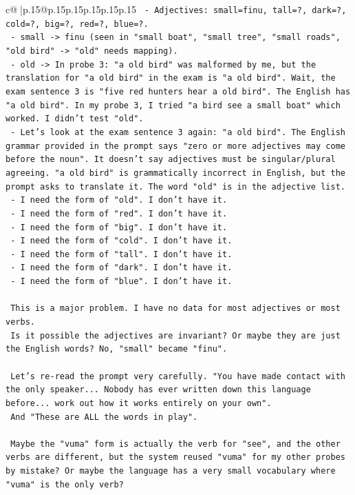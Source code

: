 \documentclass{article}
\begin{document}
{\begin{supertabular}{c@{$\;$}|p{.15\linewidth}@{}p{.15\linewidth}p{.15\linewidth}p{.15\linewidth}p{.15\linewidth}p{.15\linewidth}}
{{{\texttt{  {-} Adjectives: small=finu, tall=?, dark=?, cold=?, big=?, red=?, blue=?.} \\
\texttt{    {-} small {-}> finu (seen in "small boat", "small tree", "small roads", "old bird" {-}> "old" needs mapping).} \\
\texttt{    {-} old {-}> In probe 3: "a old bird" was malformed by me, but the translation for "a old bird" in the exam is "a old bird". Wait, the exam sentence 3 is "five red hunters hear a old bird". The English has "a old bird". In my probe 3, I tried "a bird see a small boat" which worked. I didn't test "old".} \\
\texttt{    {-} Let's look at the exam sentence 3 again: "a old bird". The English grammar provided in the prompt says "zero or more adjectives may come before the noun". It doesn't say adjectives must be singular/plural agreeing. "a old bird" is grammatically incorrect in English, but the prompt asks to translate it. The word "old" is in the adjective list.} \\
\texttt{    {-} I need the form of "old". I don't have it.} \\
\texttt{    {-} I need the form of "red". I don't have it.} \\
\texttt{    {-} I need the form of "big". I don't have it.} \\
\texttt{    {-} I need the form of "cold". I don't have it.} \\
\texttt{    {-} I need the form of "tall". I don't have it.} \\
\texttt{    {-} I need the form of "dark". I don't have it.} \\
\texttt{    {-} I need the form of "blue". I don't have it.} \\
\\ 
\texttt{    This is a major problem. I have no data for most adjectives or most verbs.} \\
\texttt{    Is it possible the adjectives are invariant? Or maybe they are just the English words? No, "small" became "finu".} \\
\\ 
\texttt{    Let's re{-}read the prompt very carefully. "You have made contact with the only speaker... Nobody has ever written down this language before... work out how it works entirely on your own".} \\
\texttt{    And "These are ALL the words in play".} \\
\\ 
\texttt{    Maybe the "vuma" form is actually the verb for "see", and the other verbs are different, but the system reused "vuma" for my other probes by mistake? Or maybe the language has a very small vocabulary where "vuma" is the only verb?} \\
}}}
\end{supertabular}}
\end{document}
